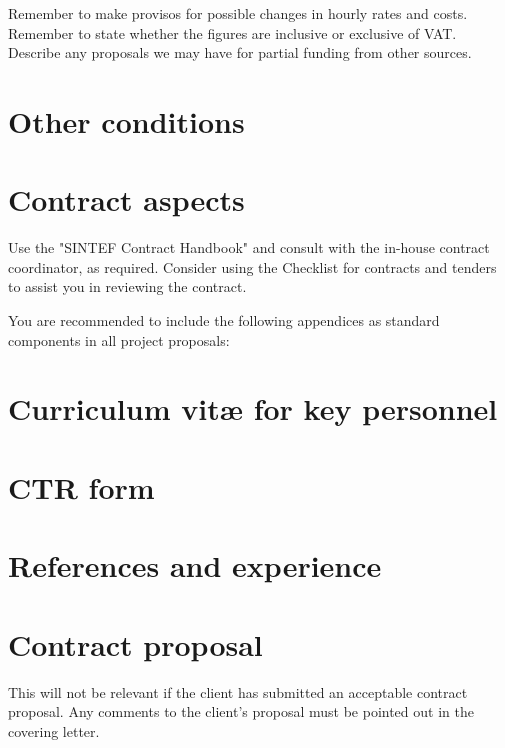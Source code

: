 \documentclass[unrestricted]{sintefprojectoffer}
\begin{document}
Remember to make provisos for possible changes in hourly rates and costs.
Remember to state whether the figures are inclusive or exclusive of VAT.
Describe any proposals we may have for partial funding from other sources.

\section{Other conditions}


\section{Contract aspects}

Use the "SINTEF Contract Handbook" and consult with the in-house contract coordinator,
as required.
Consider using the Checklist for contracts and tenders to assist you in reviewing
the contract.

\vspace{3em}
You are recommended to include the following appendices as standard components in
all project proposals:

\appendix
\section{Curriculum vitæ for key personnel}

\section{CTR form}

\section{References and experience}

\section{Contract proposal}

This will not be relevant if the client has submitted an acceptable contract
proposal.
Any comments to the client's proposal must be pointed out in the covering letter.
\end{document}
